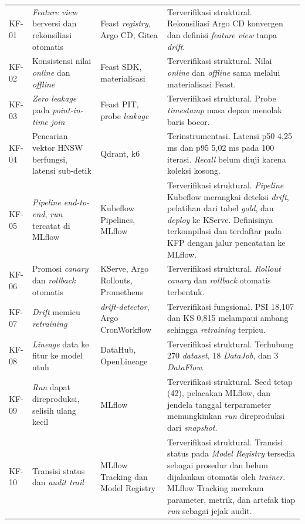 {\begin{longtable}{|>{\centering\arraybackslash}m{1.7cm}|m{3.9cm}|m{2.8cm}|m{4.4cm}|}
\multicolumn{4}{|l|}{\textbf{Kebutuhan Fungsional}} \\
\hline
KF-01 & \textit{Feature view} berversi dan rekonsiliasi otomatis & Feast \textit{registry}, Argo CD, Gitea & Terverifikasi struktural. Rekonsiliasi Argo CD konvergen dan definisi \textit{feature view} tanpa \textit{drift}. \\
\hline
KF-02 & Konsistensi nilai \textit{online} dan \textit{offline} & Feast SDK, materialisasi & Terverifikasi struktural. Nilai \textit{online} dan \textit{offline} sama melalui materialisasi Feast. \\
\hline
KF-03 & \textit{Zero leakage} pada \textit{point-in-time join} & Feast PIT, probe \textit{leakage} & Terverifikasi struktural. Probe \textit{timestamp} masa depan menolak baris bocor. \\
\hline
KF-04 & Pencarian vektor HNSW berfungsi, latensi sub-detik & Qdrant, k6 & Terinstrumentasi. Latensi p50 4,25 ms dan p95 5,02 ms pada 100 iterasi. \textit{Recall} belum diuji karena koleksi kosong. \\
\hline
KF-05 & \textit{Pipeline end-to-end}, \textit{run} tercatat di MLflow & Kubeflow Pipelines, MLflow & Terverifikasi struktural. \textit{Pipeline} Kubeflow merangkai deteksi \textit{drift}, pelatihan dari tabel \textit{gold}, dan \textit{deploy} ke KServe. Definisinya terkompilasi dan terdaftar pada KFP dengan jalur pencatatan ke MLflow. \\
\hline
KF-06 & Promosi \textit{canary} dan \textit{rollback} otomatis & KServe, Argo Rollouts, Prometheus & Terverifikasi struktural. \textit{Rollout} \textit{canary} dan \textit{rollback} otomatis terbentuk. \\
\hline
KF-07 & \textit{Drift} memicu \textit{retraining} & \textit{drift-detector}, Argo CronWorkflow & Terverifikasi fungsional. PSI 18,107 dan KS 0,815 melampaui ambang sehingga \textit{retraining} terpicu. \\
\hline
KF-08 & \textit{Lineage} data ke fitur ke model utuh & DataHub, OpenLineage & Terverifikasi struktural. Terhubung 270 \textit{dataset}, 18 \textit{DataJob}, dan 3 \textit{DataFlow}. \\
\hline
KF-09 & \textit{Run} dapat direproduksi, selisih ulang kecil & MLflow & Terverifikasi struktural. Seed tetap (42), pelacakan MLflow, dan jendela tanggal terparameter memungkinkan \textit{run} direproduksi dari \textit{snapshot}. \\
\hline
KF-10 & Transisi status dan \textit{audit trail} & MLflow Tracking dan Model Registry & Terverifikasi struktural. Transisi status pada \textit{Model Registry} tersedia sebagai prosedur dan belum dijalankan otomatis oleh \textit{trainer}. MLflow Tracking merekam parameter, metrik, dan artefak tiap \textit{run} sebagai jejak audit. \\

\end{longtable}}

